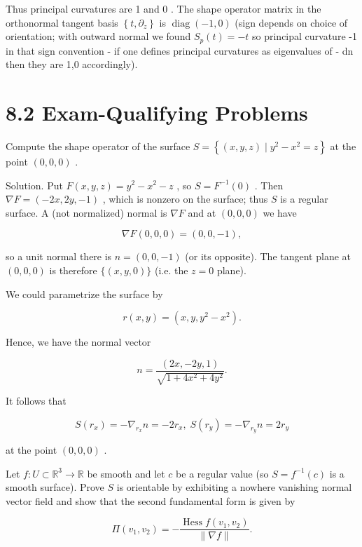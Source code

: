 \documentclass[10pt]{article}
\begin{document}
Thus principal curvatures are 1 and 0 . The shape operator matrix in the orthonormal tangent basis \(\left\{  {t,{\partial }_{z}}\right\}\) is \(\operatorname{diag}\left( {-1,0}\right)\) (sign depends on choice of orientation; with outward normal we found \({S}_{p}\left( t\right)  =  - t\) so principal curvature -1 in that sign convention - if one defines principal curvatures as eigenvalues of - dn then they are 1,0 accordingly).

\section*{8.2 Exam-Qualifying Problems}

\begin{problem}[title=PROBLEM 4 (4 POINTS)]
Compute the shape operator of the surface \(S = \left\{  {\left( {x,y,z}\right)  \mid  {y}^{2} - {x}^{2} = z}\right\}\) at the point \(\left( {0,0,0}\right)\) .
\end{problem}

Solution. Put \(F\left( {x,y,z}\right)  = {y}^{2} - {x}^{2} - z\) , so \(S = {F}^{-1}\left( 0\right)\) . Then \(\nabla F = \left( {-{2x},{2y}, - 1}\right)\) , which is nonzero on the surface; thus \(S\) is a regular surface. A (not normalized) normal is \(\nabla F\) and at \(\left( {0,0,0}\right)\) we have

\[
\nabla F\left( {0,0,0}\right)  = \left( {0,0, - 1}\right) ,
\]

so a unit normal there is \(n = \left( {0,0, - 1}\right)\) (or its opposite). The tangent plane at \(\left( {0,0,0}\right)\) is therefore \(\{ \left( {x,y,0}\right) \}\) (i.e. the \(z = 0\) plane).

We could parametrize the surface by

\[
r\left( {x,y}\right)  = \left( {x,y,{y}^{2} - {x}^{2}}\right) .
\]

Hence, we have the normal vector

\[
n = \frac{\left( 2x, - 2y,1\right) }{\sqrt{1 + 4{x}^{2} + 4{y}^{2}}}.
\]

It follows that

\[
S\left( {r}_{x}\right)  =  - {\nabla }_{{r}_{x}}n =  - 2{r}_{x},\;S\left( {r}_{y}\right)  =  - {\nabla }_{{r}_{y}}n = 2{r}_{y}
\]

at the point \(\left( {0,0,0}\right)\) .

\begin{problem}[title=PROBLEM 5 (5 POINTS)]
Let \(f : U \subset  {\mathbb{R}}^{3} \rightarrow  \mathbb{R}\) be smooth and let \(c\) be a regular value (so \(S = {f}^{-1}\left( c\right)\) is a smooth surface). Prove \(S\) is orientable by exhibiting a nowhere vanishing normal vector field and show that the second fundamental form is given by

\[
\Pi \left( {{v}_{1},{v}_{2}}\right)  =  - \frac{\operatorname{Hess}f\left( {{v}_{1},{v}_{2}}\right) }{\parallel \nabla f\parallel }.
\]
\end{problem}
\end{document}
